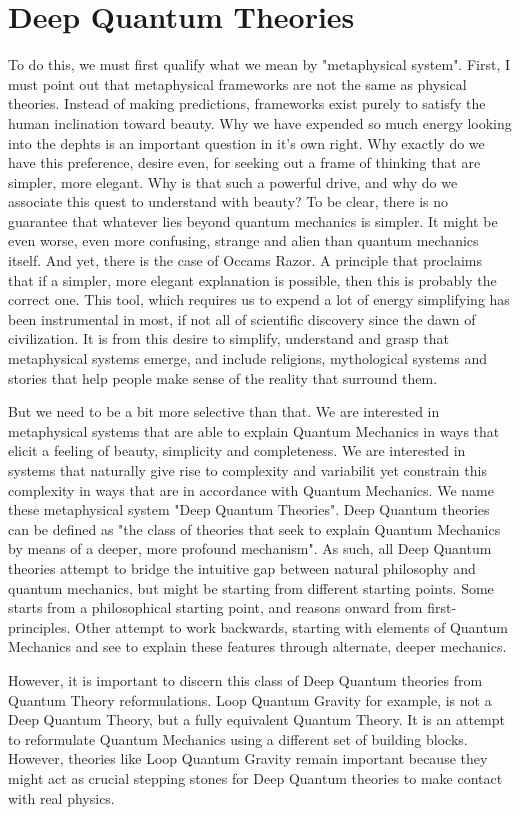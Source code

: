 \documentclass[notitlepage]{report}
\begin{document}
\section*{Deep Quantum Theories}
To do this, we must first qualify what we mean by "metaphysical system".  First, I must point out that metaphysical frameworks are not the same as physical theories. Instead of making predictions, frameworks exist purely to satisfy the human inclination toward beauty. Why we have expended so much energy looking into the dephts is an important question in it's own right. Why exactly do we have this preference, desire even, for seeking out a frame of thinking that are simpler, more elegant. Why is that such a powerful drive, and why do we associate this quest to understand with beauty? To be clear, there is no guarantee that whatever lies beyond quantum mechanics is simpler. It might be even worse, even more confusing, strange and alien than quantum mechanics itself. And yet, there is the case of Occams Razor. A principle that proclaims that if a simpler, more elegant explanation is possible, then this is probably the correct one. This tool, which requires us to expend a lot of energy simplifying has been instrumental in most, if not all of scientific discovery since the dawn of civilization. It is from this desire to simplify, understand and grasp that metaphysical systems emerge, and include religions, mythological systems and stories that help people make sense of the reality that surround them. 

But we need to be a bit more selective than that. We are interested in metaphysical systems that are able to explain Quantum Mechanics in ways that elicit a feeling of beauty, simplicity and completeness. We are interested in systems that naturally give rise to complexity and variabilit yet constrain this complexity in ways that are in accordance with Quantum Mechanics. We name these metaphysical system "Deep Quantum Theories".   Deep Quantum theories can be defined as "the class of theories that seek to explain Quantum Mechanics by means of a deeper, more profound mechanism". As such, all Deep Quantum theories attempt to bridge the intuitive gap between natural philosophy and quantum mechanics, but might be starting from different starting points. Some starts from a philosophical starting point, and reasons onward from first-principles. Other attempt to work backwards, starting with elements of Quantum Mechanics and see to explain these features through alternate, deeper mechanics.

However, it is important to discern this class of Deep Quantum theories from Quantum Theory reformulations. Loop Quantum Gravity for example, is not a Deep Quantum Theory, but a fully equivalent Quantum Theory. It is an attempt to reformulate Quantum Mechanics using a different set of building blocks. However, theories like Loop Quantum Gravity remain important because they might act as crucial stepping stones for Deep Quantum theories to make contact with real physics.
\end{document}
